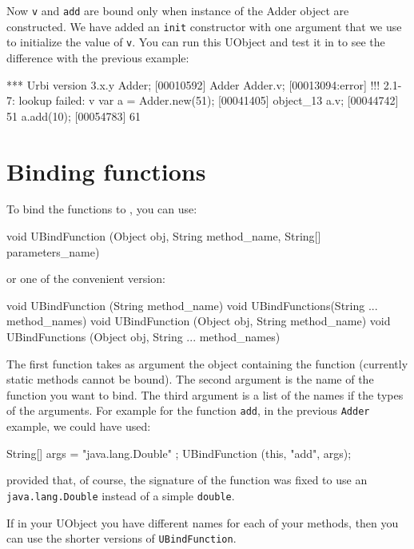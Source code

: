 Now \lstinline{v} and \lstinline{add} are bound only when instance of the
Adder object are constructed.  We have added an \lstinline{init} constructor
with one argument that we use to initialize the value of \lstinline{v}.  You
can run this UObject and test it in \urbi to see the difference with the
previous example:

\begin{urbiunchecked}
[00000097] *** Urbi version 3.x.y
Adder;
[00010592] Adder
Adder.v;
[00013094:error] !!! 2.1-7: lookup failed: v
var a = Adder.new(51);
[00041405] object_13
a.v;
[00044742] 51
a.add(10);
[00054783] 61
\end{urbiunchecked}


\section{Binding functions}
\label{sec:uob:apijava:func}

To bind the functions to \urbi, you can use:
\begin{java}
void UBindFunction (Object obj, String method_name, String[] parameters_name)
\end{java}
or one of the convenient version:
\begin{java}
void UBindFunction (String method_name)
void UBindFunctions(String ... method_names)
void UBindFunction (Object obj, String method_name)
void UBindFunctions (Object obj, String ... method_names)
\end{java}

The first function takes as argument the object containing the function
(currently static methods cannot be bound). The second argument is the name
of the function you want to bind.  The third argument is a list of the names
if the types of the arguments.  For example for the function
\lstinline{add}, in the previous \lstinline{Adder} example, we could have
used:

\begin{java}
String[] args = { "java.lang.Double" };
UBindFunction (this, "add", args);
\end{java}

\noindent
provided that, of course, the signature of the function was fixed to use an
\lstinline{java.lang.Double} instead of a simple \lstinline{double}.

If in your UObject you have different names for each of your methods, then
you can use the shorter versions of \lstinline{UBindFunction}.


